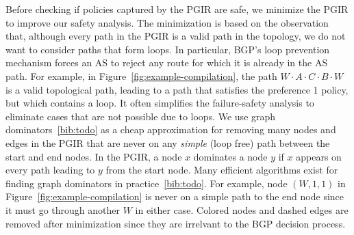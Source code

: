 Before checking if policies captured by the PGIR are safe, we minimize the PGIR to improve our safety analysis. 
The minimization is based on the observation that, although every path in the PGIR is a valid path in the topology, we do not want to consider paths that form loops. In particular, BGP's loop prevention mechanism forces an AS to reject any route for which it is already in the AS path.
%
For example, in Figure~\ref{fig:example-compilation}, the path $W \cdot A \cdot C \cdot B \cdot W$ is a valid topological path, leading to a path that satisfies the preference 1 policy, but which contains a loop.
%
It often simplifies the failure-safety analysis to eliminate cases that are not possible due to loops. 
We use graph dominators~\ref{bib:todo} as a cheap approximation for removing many nodes and edges in the PGIR that are never on any \emph{simple} (loop free) path between the start and end nodes.
In the PGIR, a node $x$ dominates a node $y$ if $x$ appears on every path leading to $y$ from the start node. Many efficient algorithms exist for finding graph dominators in practice~\ref{bib:todo}.
For example, node $(W,1,1)$ in Figure~\ref{fig:example-compilation} is never on a simple path to the end node since it must go through another $W$ in either case.
Colored nodes and dashed edges are removed after minimization since they are irrelvant to the BGP decision process.
%

%
%

